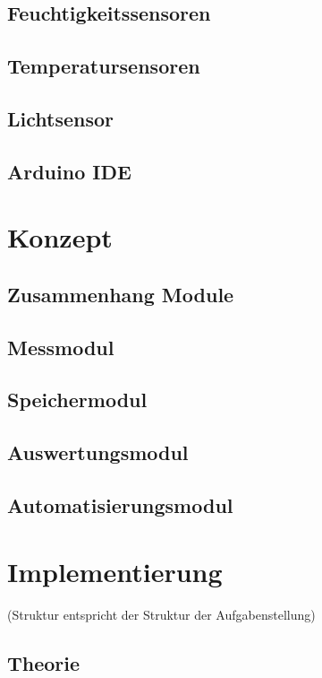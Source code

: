 \documentclass[
    load-dhbw-templates,
    load-preamble = true,
    auto-intro-pages = all,
    add-tocs-to-toc,
    debug = true,
    language = english,
    mainlanguage = ngerman,
    add-bibliography,
    bib-file = dhbw-source.bib,
    biblatex/style = alphabetic, 
]{iodhbwm}
\begin{document}
        \subsection{Feuchtigkeitssensoren}



        
        \subsection{Temperatursensoren}
        \subsection{Lichtsensor}
        \subsection{Arduino IDE}
    \section{Konzept}
        \subsection{Zusammenhang Module}
        \subsection{Messmodul}
        \subsection{Speichermodul}
        \subsection{Auswertungsmodul}
        \subsection{Automatisierungsmodul}
    \section{Implementierung}
        (Struktur entspricht der Struktur der Aufgabenstellung)
        \subsection{Theorie}
\end{document}
